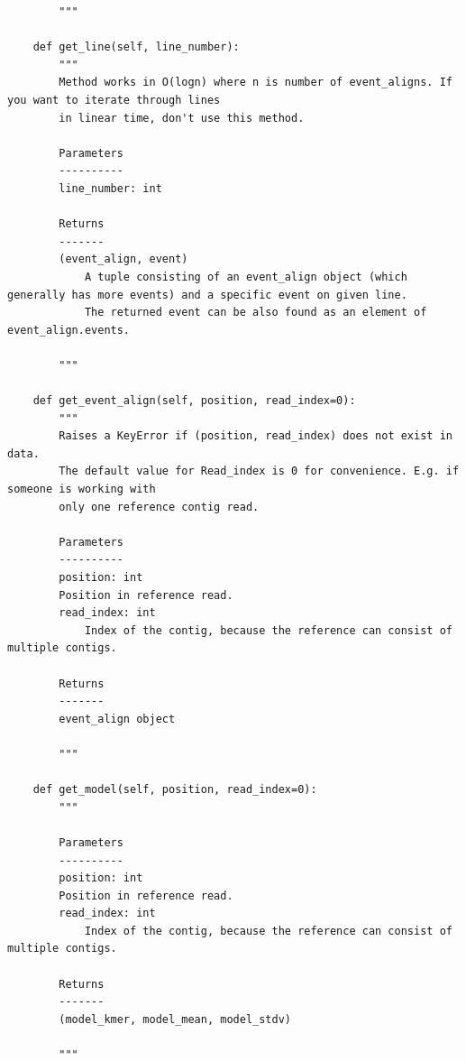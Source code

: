 \documentclass[times, utf, seminar]{fer}
\begin{document}
\begin{lstlisting}
		"""
	
	def get_line(self, line_number):
		"""
		Method works in O(logn) where n is number of event_aligns. If you want to iterate through lines
		in linear time, don't use this method. 
		
		Parameters
		----------
		line_number: int
		
		Returns
		-------
		(event_align, event)
			A tuple consisting of an event_align object (which generally has more events) and a specific event on given line.
			The returned event can be also found as an element of event_align.events.
		
		"""
	
	def get_event_align(self, position, read_index=0):
		"""
		Raises a KeyError if (position, read_index) does not exist in data.  
		The default value for Read_index is 0 for convenience. E.g. if someone is working with
		only one reference contig read.
		
		Parameters
		----------
		position: int
		Position in reference read. 
		read_index: int
			Index of the contig, because the reference can consist of multiple contigs.
		
		Returns
		-------
		event_align object
		
		"""
	
	def get_model(self, position, read_index=0):
		"""
		
		Parameters
		----------
		position: int
		Position in reference read.
		read_index: int
			Index of the contig, because the reference can consist of multiple contigs.
		
		Returns
		-------
		(model_kmer, model_mean, model_stdv)
		
		"""
\end{lstlisting}



\end{document}

